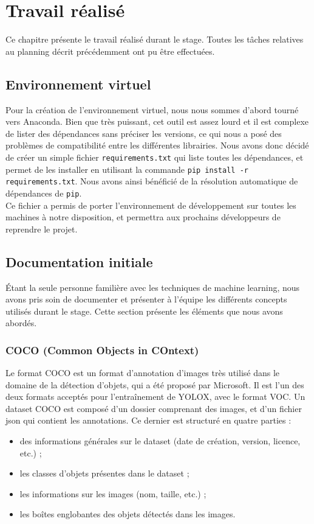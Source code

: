 \chapter{Travail réalisé}

Ce chapitre présente le travail réalisé durant le stage. Toutes les tâches relatives au planning décrit précédemment ont pu être effectuées.

\section{Environnement virtuel}

Pour la création de l'environnement virtuel, nous nous sommes d'abord tourné vers Anaconda.
Bien que très puissant, cet outil est assez lourd et il est complexe de lister des dépendances
sans préciser les versions, ce qui nous a posé des problèmes de compatibilité entre les différentes
librairies.
Nous avons donc décidé de créer un simple fichier \texttt{requirements.txt} qui liste
toutes les dépendances, et permet de les installer en utilisant la commande
\texttt{pip install -r requirements.txt}. Nous avons ainsi bénéficié de la 
résolution automatique de dépendances de \texttt{pip}.\\

Ce fichier a permis de porter l'environnement de développement sur toutes les machines
à notre disposition, et permettra aux prochains développeurs de reprendre le projet.

\section{Documentation initiale}

Étant la seule personne familière avec les techniques de machine learning, nous avons pris soin de documenter
et présenter à l'équipe les différents concepts utilisés durant le stage. Cette section présente
les éléments que nous avons abordés.

\subsection{COCO (Common Objects in COntext)}

Le format COCO\cite{MicrosoftCOCO} est un format d'annotation d'images très utilisé dans le domaine de la détection d'objets,
qui a été proposé par Microsoft.
Il est l'un des deux formats acceptés pour l'entraînement de YOLOX, avec le format VOC.
Un dataset COCO est composé d'un dossier comprenant des images, et d'un fichier json qui contient les annotations.
Ce dernier est structuré en quatre parties :
\begin{itemize}
    \item des informations générales sur le dataset (date de création, version, licence, etc.) ;
    \item les classes d'objets présentes dans le dataset ;
    \item les informations sur les images (nom, taille, etc.) ;
    \item les boîtes englobantes des objets détectés dans les images.
\end{itemize}

